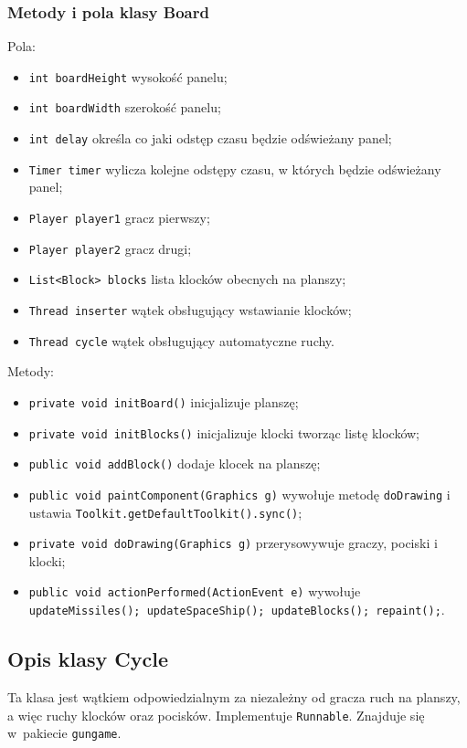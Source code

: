 \documentclass[12pt]{report}
\newcommand{\code}[1]{\texttt{#1}}
\begin{document}
\subsubsection{Metody i pola klasy Board}
Pola:
\begin{itemize}
    \item \code{int boardHeight} wysokość panelu;
    \item \code{int boardWidth} szerokość panelu;
    \item \code{int delay} określa co jaki odstęp czasu będzie odświeżany panel;
    \item \code{Timer timer} wylicza kolejne odstępy czasu, w których będzie odświeżany panel;
    \item \code{Player player1} gracz pierwszy;
    \item \code{Player player2} gracz drugi;
    \item \code{List<Block> blocks} lista klocków obecnych na planszy;
    \item \code{Thread inserter} wątek obsługujący wstawianie klocków;
    \item \code{Thread cycle} wątek obsługujący automatyczne ruchy.
\end{itemize}
Metody:
\begin{itemize}
    \item \code{private void initBoard()} inicjalizuje planszę;
    \item \code{private void initBlocks()} inicjalizuje klocki tworząc listę klocków;
    \item \code{public void addBlock()} dodaje klocek na planszę;
    \item \code{public void paintComponent(Graphics g)}  wywołuje metodę \code{doDrawing} i ustawia \code{Toolkit.getDefaultToolkit().sync()};
    \item \code{private void doDrawing(Graphics g)} przerysowywuje graczy, pociski i klocki;
    \item \code{public void actionPerformed(ActionEvent e)} wywołuje \code{updateMissiles(); updateSpaceShip(); updateBlocks(); repaint();}.
    
\end{itemize}
\subsection{Opis klasy Cycle}
Ta klasa jest wątkiem odpowiedzialnym za niezależny od gracza ruch na planszy, a więc ruchy klocków oraz pocisków. Implementuje \code{Runnable}. Znajduje się w~pakiecie \code{gungame}.
\end{document}
